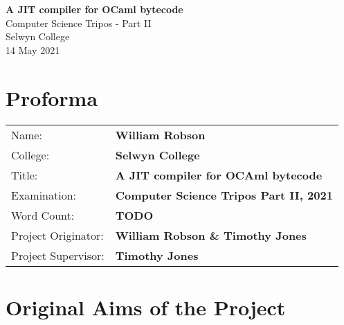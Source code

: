 
\newcommand{\thedate}{14 May 2021}

\begin{titlepage}


    \vspace*{60mm}

    \begin{center}
        \Huge
        \textbf{A JIT compiler for OCaml bytecode} \\[5mm]
        \Large
        Computer Science Tripos - Part II \\[5mm]
        Selwyn College \\[5mm]
        \thedate
    \end{center}

    \cleardoublepage

\end{titlepage}


\section*{Proforma}

 {\large

  \begin{tabular}{ll}
      Name:               & \textbf{William Robson}                        \\
      College:            & \textbf{Selwyn College}                        \\
      Title:              & \textbf{A JIT compiler for OCAml bytecode}     \\
      Examination:        & \textbf{Computer Science Tripos Part II, 2021} \\
      Word Count:         & \textbf{TODO\footnotemark}
      \\
      Project Originator: & \textbf{William Robson \& Timothy Jones}       \\
      Project Supervisor: & \textbf{Timothy Jones}                         \\
  \end{tabular}
 }
\section*{Original Aims of the Project}

